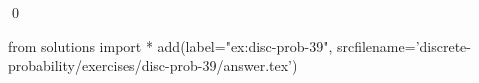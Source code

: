 
\begin{ex} 
  \label{ex:disc-prob-39}
  
  \qed
\end{ex} 
\begin{python0}
from solutions import *
add(label="ex:disc-prob-39",
    srcfilename='discrete-probability/exercises/disc-prob-39/answer.tex') 
\end{python0}
